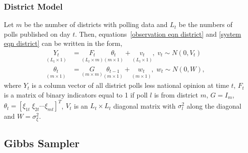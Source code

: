 \documentclass[12pt,final,fleqn]{article}
\theoremstyle{plain}
\begin{document}
\subsubsection{District Model} 
Let $m$ be the number of districts with polling data and $L_t$ be the numbers of polls published on day $t$. Then, equations~\ref{observation eqn district} and \ref{system eqn district} can be written in the form,
\begin{align}
\label{eqn: dlm observation}
\underset{(L_t \times 1)}{Y_t} &= \underset{(L_t \times m)}{F_t} \underset{(m \times 1)}{\theta_t} + \underset{(L_t \times 1)}{v_t},\; v_t \sim N(0, V_t)\\
\label{eqn: dlm state}
\underset{(m \times 1)}{\theta_t} &= \underset{(m \times m)}{G}\underset{(m \times 1)}{\theta_{t-1}} + \underset{(m \times 1)}{w_t},\; w_t \sim N(0, W),
\end{align}
where $Y_t$ is a column vector of all district polls less national opinion at time $t$, $F_t$ is a matrix of binary indicators equal to 1 if poll $l$ is from district $m$, $G= I_m$, $\theta_t = [\xi_{1t}\; \xi_{2t}\cdots \xi_{mt}]^T$, $V_t$ is an $L_t \times L_t$ diagonal matrix with $\sigma^2_l$ along the diagonal and $W = \sigma^2_\xi$.

\subsection{Gibbs Sampler}
\end{document}
